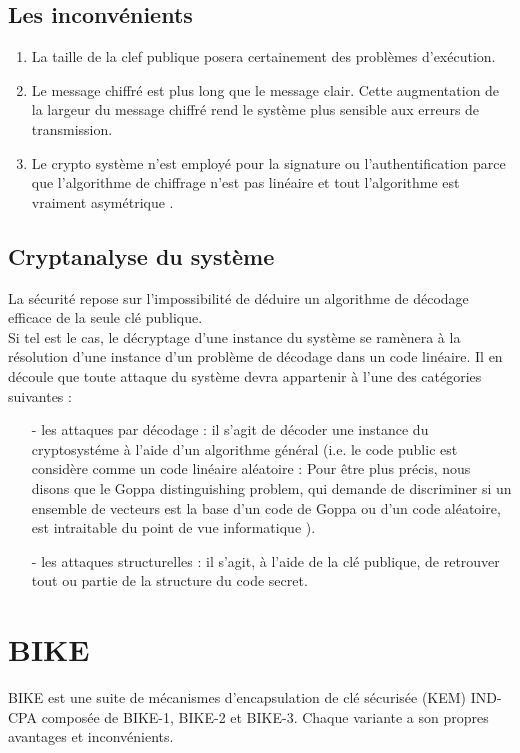 \documentclass[12pt,openany]{report}
\begin{document}
\subsection{Les inconvénients}
\begin{enumerate}


\item La taille de la clef publique posera certainement des problèmes
d'exécution.
\item Le message chiffré est plus long que le message clair. Cette augmentation de la largeur du
message chiffré rend le système plus sensible aux erreurs de transmission.
\item Le crypto système n’est employé pour la signature ou l'authentification parce que
l'algorithme de chiffrage n'est pas linéaire et tout l’algorithme est vraiment asymétrique .

\end{enumerate}
\subsection{Cryptanalyse du système}

La sécurité repose sur l’impossibilité de déduire un algorithme de décodage efficace de la
seule clé publique.\\
Si tel est le cas, le décryptage d’une instance du système se ramènera à la résolution d’une
instance d’un problème de décodage dans un code linéaire. Il en découle que toute attaque du
système devra appartenir à l’une des catégories suivantes :
\begin{itemize}


\item[-] les attaques par décodage : il s’agit de décoder une instance du cryptosystéme à l’aide
d’un algorithme général (i.e. le code public est considère comme un code linéaire aléatoire :  Pour être plus
précis, nous disons que le Goppa distinguishing problem, qui demande de discriminer
si un ensemble de vecteurs est la base d’un code de Goppa ou d’un code aléatoire,
est intraitable du point de vue informatique ).

\item[-] les attaques structurelles : il s’agit, à l’aide de la clé publique, de retrouver tout ou partie
de la structure du code secret.
\end{itemize}
\section{BIKE}
BIKE est une suite de mécanismes d'encapsulation de clé sécurisée (KEM) IND-CPA composée de BIKE-1, BIKE-2 et BIKE-3. Chaque variante a son
propres avantages et inconvénients.\\ \cite{Rap}
\end{document}
